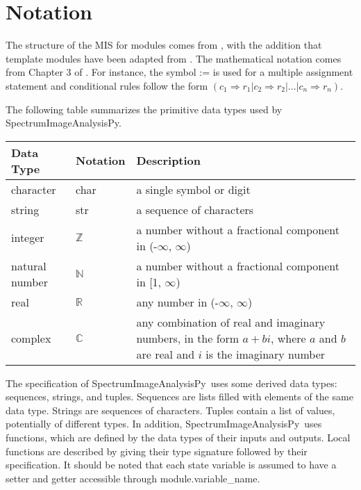 \documentclass[12pt, titlepage]{article}
\newcommand{\progname}{SpectrumImageAnalysisPy}
\begin{document}
\section{Notation}
The structure of the MIS for modules comes from \cite{HoffmanAndStrooper1995},
with the addition that template modules have been adapted from
\cite{GhezziEtAl2003}.  The mathematical notation comes from Chapter 3 of
\cite{HoffmanAndStrooper1995}.  For instance, the symbol := is used for a
multiple assignment statement and conditional rules follow the form $(c_1
\Rightarrow r_1 | c_2 \Rightarrow r_2 | ... | c_n \Rightarrow r_n )$.

The following table summarizes the primitive data types used by \progname. 

\begin{center}
    \renewcommand{\arraystretch}{1.2}
    \noindent 
    \begin{tabular}{l l p{7.5cm}} 
        \toprule 
        \textbf{Data Type} & \textbf{Notation} & \textbf{Description}\\ 
        \midrule
        character & char & a single symbol or digit\\
        string & str & a sequence of characters\\
        integer & $\mathbb{Z}$ & a number without a fractional component in (-$\infty$,
        $\infty$) \\
        natural number & $\mathbb{N}$ & a number without a fractional component in [1,
        $\infty$) \\
        real & $\mathbb{R}$ & any number in (-$\infty$, $\infty$)\\
        complex & $\mathbb{C}$ & any combination of real and imaginary numbers, in the
        form $a+bi$, where $a$ and $b$ are real and $i$ is the imaginary number\\
        \bottomrule
    \end{tabular} 
\end{center}

\noindent
The specification of \progname \ uses some derived data types: sequences,
strings, and
tuples. Sequences are lists filled with elements of the same data type. Strings
are sequences of characters. Tuples contain a list of values, potentially of
different types. In addition, \progname \ uses functions, which
are defined by the data types of their inputs and outputs. Local functions are
described by giving their type signature followed by their specification. It
should be noted that each state variable is assumed to have a setter and getter
accessible through module.variable\_name.
\end{document}
